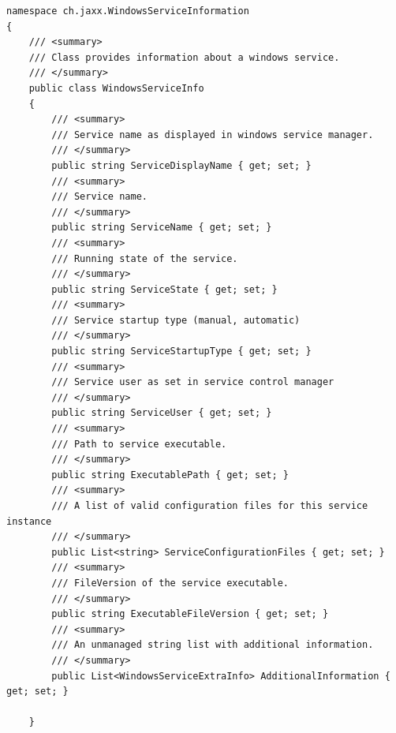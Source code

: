 \documentclass[11pt,DIV=15]{scrreprt}
\begin{document}
\begin{lstlisting}
namespace ch.jaxx.WindowsServiceInformation
{
    /// <summary>
    /// Class provides information about a windows service.
    /// </summary>
    public class WindowsServiceInfo
    {
        /// <summary>
        /// Service name as displayed in windows service manager.
        /// </summary>
        public string ServiceDisplayName { get; set; }
        /// <summary>
        /// Service name.
        /// </summary>
        public string ServiceName { get; set; }
        /// <summary>
        /// Running state of the service.
        /// </summary>
        public string ServiceState { get; set; }
        /// <summary>
        /// Service startup type (manual, automatic)
        /// </summary>
        public string ServiceStartupType { get; set; }
        /// <summary>
        /// Service user as set in service control manager
        /// </summary>
        public string ServiceUser { get; set; }
        /// <summary>
        /// Path to service executable.
        /// </summary>
        public string ExecutablePath { get; set; }
        /// <summary>
        /// A list of valid configuration files for this service instance
        /// </summary>
        public List<string> ServiceConfigurationFiles { get; set; }
        /// <summary>
        /// FileVersion of the service executable.
        /// </summary>
        public string ExecutableFileVersion { get; set; }
        /// <summary>
        /// An unmanaged string list with additional information.
        /// </summary>
        public List<WindowsServiceExtraInfo> AdditionalInformation { get; set; }
       
    }

\end{lstlisting}
\end{document}
